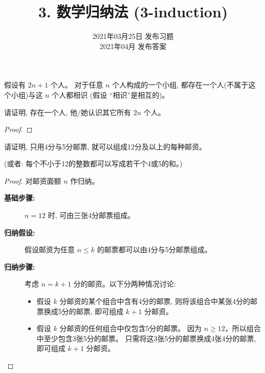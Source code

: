 \documentclass[a4paper, justified]{tufte-handout}
\title{3. 数学归纳法 (3-induction)}
\date{2021年03月25日 发布习题 \\ 2021年04月 发布答案}
\begin{document}
\maketitle
\noplagiarism %
\begin{abstract}
\end{abstract}
\beginrequired

\begin{problem}
  假设有 $2n + 1$ 个人。
  对于任意 $n$ 个人构成的一个小组,
  都存在一个人(不属于这个小组)与这 $n$ 个人都相识 (假设 ``相识''是相互的)。

  \noindent 请证明, 存在一个人, 他/她认识其它所有 $2n$ 个人。
\end{problem}

\begin{proof}
\end{proof}

\begin{problem}
  请证明, 只用4分与5分邮票, 就可以组成12分及以上的每种邮资。

  \noindent (或者: 每个不小于12的整数都可以写成若干个4或5的和。)
\end{problem}

\begin{proof}
  对邮资面额 $n$ 作归纳。
  \begin{description}
    \item[{\bf 基础步骤:}] $n = 12$ 时, 可由三张4分邮票组成。
    \item[{\bf 归纳假设:}] 假设邮资为任意 $n \le k$ 的邮票都可以由4分与5分邮票组成。
    \item[{\bf 归纳步骤:}] 考虑 $n = k + 1$ 分的邮资。以下分两种情况讨论:
      \begin{itemize}
        \item 假设 $k$ 分邮资的某个组合中含有4分的邮票,
          则将该组合中某张4分的邮票换成5分的邮票, 即可组成 $k+1$ 分邮资。
        \item 假设 $k$ 分邮资的任何组合中仅包含5分的邮票。
          因为 $n \ge 12$，所以组合中至少包含3张5分的邮票。
          只需将这3张5分的邮票换成4张4分的邮票, 即可组成 $k+1$ 分邮资。
      \end{itemize}
  \end{description}
\end{proof}
\end{document}
